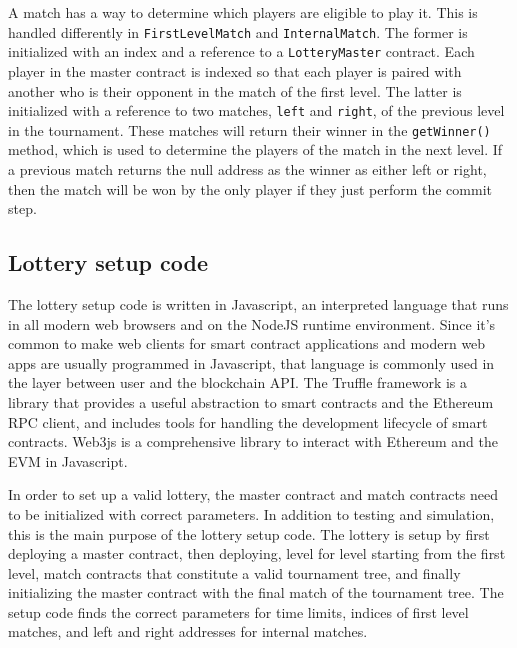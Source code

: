 A match has a way to determine which players are eligible to play it. This is handled differently in \texttt{FirstLevelMatch} and \texttt{InternalMatch}. The former is initialized with an index and a reference to a \texttt{LotteryMaster} contract. Each player in the master contract is indexed so that each player is paired with another who is their opponent in the match of the first level. The latter is initialized with a reference to two matches, \texttt{left} and \texttt{right}, of the previous level in the tournament. These matches will return their winner in the \texttt{getWinner()} method, which is used to determine the players of the match in the next level. If a previous match returns the null address as the winner as either left or right, then the match will be won by the only player if they just perform the commit step.





\subsection{Lottery setup code}
The lottery setup code is written in Javascript, an interpreted language that runs in all modern web browsers and on the NodeJS runtime environment. Since it's common to make web clients for smart contract applications and modern web apps are usually programmed in Javascript, that language is commonly used in the layer between user and the blockchain API. The Truffle framework is a library that provides a useful abstraction to smart contracts and the Ethereum RPC client, and includes tools for handling the development lifecycle of smart contracts. Web3js is a comprehensive library to interact with Ethereum and the EVM in Javascript.

In order to set up a valid lottery, the master contract and match contracts need to be initialized with correct parameters. In addition to testing and simulation, this is the main purpose of the lottery setup code. The lottery is setup by first deploying a master contract, then deploying, level for level starting from the first level, match contracts that constitute a valid tournament tree, and finally initializing the master contract with the final match of the tournament tree. The setup code finds the correct parameters for time limits, indices of first level matches, and left and right addresses for internal matches. 

